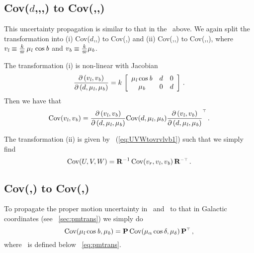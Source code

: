 \subsection{Cov($d$,\vrr,\pmll,\pmbb) to Cov(\galU,\galV,\galW)}

This uncertainty propagation is similar to that in the \sectionname\ above. We again split the transformation into (i) Cov($d$,\pmll,\pmbb) to Cov(\vll,\vbb) and (ii) Cov(\vrr,\vll,\vbb) to Cov(\galU,\galV,\galW), where $v_{\it l} \equiv
\frac{k}{\varpi}\,\mu_{\it l}\,\cos{\it b}$ and $v_{\it b} \equiv \frac{k}{\varpi}\mu_{\it b}$.

The transformation (i) is non-linear with Jacobian
\begin{equation}
\frac{\partial \left(v_{\it l},v_{\it b}\right)}{\partial\left(d,\mu_{\it l},\mu_{\it b}\right)}
= k\,\left[ \begin{array}{ccc} \mu_{\it l} \cos {\it b} & d & 0\\\mu_{\it b} & 0 & d\end{array} \right] \,.
\end{equation}
Then we have that
\begin{equation}
\mathrm{Cov}(v_{\it l},v_{\it b}) = \frac{\partial \left(
  v_{\it l},v_{\it b}\right)}{\partial \left(d,\mu_{\it l},\mu_{\it b}\right)}
\mathrm{Cov}(d,\mu_{\it l},\mu_{\it b}) \frac{\partial \left(
  v_{\it l},v_{\it b}\right)}{\partial \left(d,\mu_{\it l},\mu_{\it b}\right)}^{\scriptscriptstyle \top}\,.
\end{equation}

The transformation (ii) is given by
\eqnname~(\ref{eq:UVWtovrvlvb1}) such that we simply find
\begin{equation}
\mathrm{Cov}(U,V,W) = \mathbf{R}^{-1}\, \mathrm{Cov}(v_r,v_{\it l},v_{\it b}) \, \mathbf{R}^{\scriptscriptstyle -\top}\,.
\end{equation}

\subsection{Cov(\pmra,\pmdec) to Cov(\pmll,\pmbb)}

To propagate the proper motion uncertainty in \ra\ and \dec\ to that
in Galactic coordinates (see \sectionname~\ref{sec:pmtrans}) we simply do
\begin{equation}
\mathrm{Cov}(\mu_{\it l} \cos {\it b},\mu_{\it b}) = \mbox{\bf P}\, \mathrm{Cov}(\mu_{\alpha} \cos \delta ,\mu_{\delta}) \,\mbox{\bf P}^{\scriptscriptstyle \top}\,,
\end{equation}
where \PP\ is defined below \eqnname~\ref{eq:pmtrans}.



